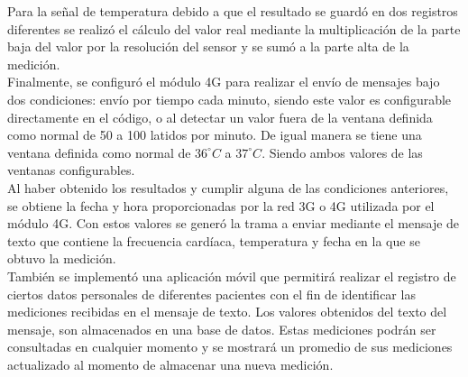 Para la señal de temperatura debido a que el resultado se guardó en dos registros diferentes se realizó el cálculo del valor real mediante la multiplicación de la parte baja del valor por la resolución del sensor y se sumó a la parte alta de la medición.\\

Finalmente, se configuró el módulo 4G para realizar el envío de mensajes bajo dos condiciones: envío por tiempo cada minuto, siendo este valor es configurable directamente en el código, o al detectar un valor fuera de la ventana definida como normal de 50 a 100 latidos por minuto. De igual manera se tiene una ventana definida como normal de $36^{\circ}C$ a $37^{\circ}C$. Siendo ambos valores de las ventanas configurables. \\

Al haber obtenido los resultados y cumplir alguna de las condiciones anteriores, se obtiene la fecha y hora proporcionadas por la red 3G o 4G utilizada por el módulo 4G. Con estos valores se generó la trama a enviar mediante el mensaje de texto que contiene la frecuencia cardíaca, temperatura y fecha en la que se obtuvo la medición. \\

También se implementó una aplicación móvil que permitirá realizar el registro de ciertos datos personales de diferentes pacientes con el fin de identificar las mediciones recibidas en el mensaje de texto. Los valores obtenidos del texto del mensaje, son almacenados en una base de datos. Estas mediciones podrán ser consultadas en cualquier momento y se mostrará un promedio de sus mediciones actualizado al momento de almacenar una nueva medición.